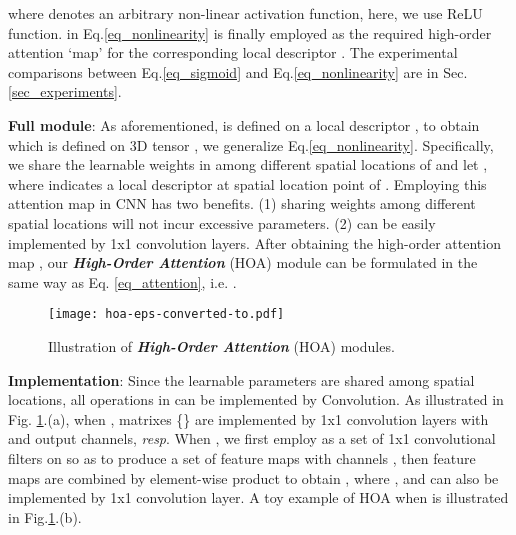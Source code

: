 \documentclass[10pt,twocolumn,letterpaper]{article}
\begin{document}
where  denotes an arbitrary non-linear activation function, here, we use ReLU \cite{nair2010rectified} function.  in Eq.\ref{eq_nonlinearity} is finally employed as the required high-order attention `map' for the corresponding local descriptor . The experimental comparisons between Eq.\ref{eq_sigmoid} and Eq.\ref{eq_nonlinearity} are in Sec. \ref{sec_experiments}.

\textbf{Full module}: As aforementioned,  is defined on a local descriptor , to obtain  which is defined on 3D tensor , we generalize Eq.\ref{eq_nonlinearity}. Specifically, we share the learnable weights in  among different spatial locations of  and let , where  indicates a local descriptor at spatial location point  of . Employing this attention map  in CNN has two benefits. (1) sharing weights among different spatial locations will not incur excessive parameters. (2)  can be easily implemented by 1x1 convolution layers. After obtaining the high-order attention map , our \emph{\textbf{High-Order Attention}} (HOA) module can be formulated in the same way as Eq. \ref{eq_attention}, i.e. .
\begin{figure}[t]
  \centering
\texttt{[image: hoa-eps-converted-to.pdf]}\\
  \caption{Illustration of \textbf{\emph{High-Order Attention}} (HOA) modules.}\label{fig_hoa}
  \vspace{-1.5em}
\end{figure}

\textbf{Implementation}: Since the learnable parameters are shared among spatial locations, all operations in  can be implemented by Convolution. As illustrated in Fig. \ref{fig_hoa}.(a), when , matrixes \{\} are implemented by 1x1 convolution layers with  and  output channels, \emph{resp}. When , we first employ  as a set of  1x1 convolutional filters on  so as to produce a set of feature maps  with channels , then feature maps  are combined by element-wise product to obtain , where , and  can also be implemented by 1x1 convolution layer. A toy example of HOA when  is illustrated in Fig.\ref{fig_hoa}.(b).
\end{document}
